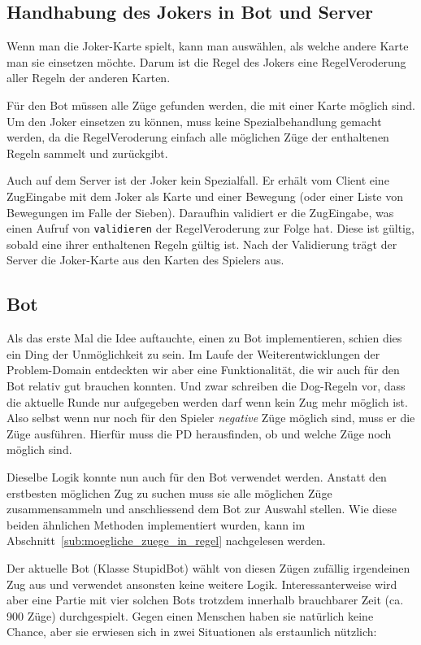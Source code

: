 \documentclass[12pt,halfparskip]{scrartcl}
\begin{document}
\subsection{Handhabung des Jokers in Bot und Server}

Wenn man die Joker-Karte spielt, kann man auswählen, als welche andere Karte man sie einsetzen möchte. Darum ist die Regel des Jokers eine RegelVeroderung aller Regeln der anderen Karten.

Für den Bot müssen alle Züge gefunden werden, die mit einer Karte möglich sind. Um den Joker einsetzen zu können, muss keine Spezialbehandlung gemacht werden, da die RegelVeroderung einfach alle möglichen Züge der enthaltenen Regeln sammelt und zurückgibt.

Auch auf dem Server ist der Joker kein Spezialfall. Er erhält vom Client eine ZugEingabe mit dem Joker als Karte und einer Bewegung (oder einer Liste von Bewegungen im Falle der Sieben). Daraufhin validiert er die ZugEingabe, was einen Aufruf von \texttt{validieren} der RegelVeroderung zur Folge hat. Diese ist gültig, sobald eine ihrer enthaltenen Regeln gültig ist. Nach der Validierung trägt der Server die Joker-Karte aus den Karten des Spielers aus.

\subsection{Bot}

Als das erste Mal die Idee auftauchte, einen zu Bot implementieren, schien dies ein Ding der Unmöglichkeit zu sein. Im Laufe der Weiterentwicklungen der Problem-Domain entdeckten wir aber eine Funktionalität, die wir auch für den Bot relativ gut brauchen konnten. Und zwar schreiben die Dog-Regeln vor, dass die aktuelle Runde nur aufgegeben werden darf wenn kein Zug mehr möglich ist. Also selbst wenn nur noch für den Spieler \emph{negative} Züge möglich sind, muss er die Züge ausführen. Hierfür muss die PD herausfinden, ob und welche Züge noch möglich sind.

Dieselbe Logik konnte nun auch für den Bot verwendet werden. Anstatt den erstbesten möglichen Zug zu suchen muss sie alle möglichen Züge zusammensammeln und anschliessend dem Bot zur Auswahl stellen. Wie diese beiden ähnlichen Methoden implementiert wurden, kann im Abschnitt~\vref{sub:moegliche_zuege_in_regel} nachgelesen werden.

Der aktuelle Bot (Klasse StupidBot) wählt von diesen Zügen zufällig irgendeinen Zug aus und verwendet ansonsten keine weitere Logik. Interessanterweise wird aber eine Partie mit vier solchen Bots trotzdem innerhalb brauchbarer Zeit (ca. 900 Züge) durchgespielt. Gegen einen Menschen haben sie natürlich keine Chance, aber sie erwiesen sich in zwei Situationen als erstaunlich nützlich:
\end{document}
